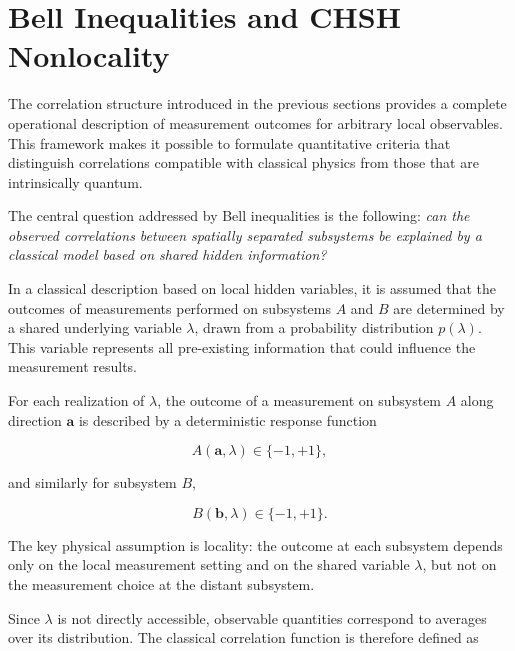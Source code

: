 
\section{Bell Inequalities and CHSH Nonlocality}

The correlation structure introduced in the previous sections provides a complete operational description of measurement outcomes for arbitrary local observables. This framework makes it possible to formulate quantitative criteria that distinguish correlations compatible with classical physics from those that are intrinsically quantum.

\medskip

The central question addressed by Bell inequalities is the following: \emph{can the observed correlations between spatially separated subsystems be explained by a classical model based on shared hidden information?}

\medskip

In a classical description based on local hidden variables, it is assumed that the outcomes of measurements performed on subsystems \( A \) and \( B \) are determined by a shared underlying variable \( \lambda \), drawn from a probability distribution \( p(\lambda) \). This variable represents all pre-existing information that could influence the measurement results.

\medskip

For each realization of \( \lambda \), the outcome of a measurement on subsystem \( A \) along direction \( \mathbf{a} \) is described by a deterministic response function

\[
A(\mathbf{a},\lambda) \in \{-1,+1\},
\]

and similarly for subsystem \( B \),

\[
B(\mathbf{b},\lambda) \in \{-1,+1\}.
\]

\medskip

The key physical assumption is locality: the outcome at each subsystem depends only on the local measurement setting and on the shared variable \( \lambda \), but not on the measurement choice at the distant subsystem.

Since \( \lambda \) is not directly accessible, observable quantities correspond to averages over its distribution. The classical correlation function is therefore defined as


